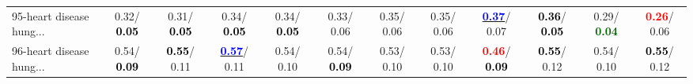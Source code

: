 \begin{table}[h]
\begin{center}
{\begin{tabular}{lc|c|c|c|c|c|c|c|c|c|c}
95-heart disease hung... &   0.32/\textcolor{black}{\textbf{  0.05}} &   0.31/\textcolor{black}{\textbf{  0.05}} &   0.34/\textcolor{black}{\textbf{  0.05}} &   0.34/\textcolor{black}{\textbf{  0.05}} &   0.33/  0.06 &   0.35/  0.06 &   0.35/  0.06 & \underline{\textcolor{blue}{\textbf{  0.37}}}/  0.07 & \textcolor{black}{\textbf{  0.36}}/\textcolor{black}{\textbf{  0.05}} &   0.29/\textcolor{darkgreen}{\textbf{  0.04}} & \textcolor{red}{\textbf{  0.26}}/  0.06 \\
96-heart disease hung... &   0.54/\textcolor{black}{\textbf{  0.09}} & \textcolor{black}{\textbf{  0.55}}/  0.11 & \underline{\textcolor{blue}{\textbf{  0.57}}}/  0.11 &   0.54/  0.10 &   0.54/\textcolor{black}{\textbf{  0.09}} &   0.53/  0.10 &   0.53/  0.10 & \textcolor{red}{\textbf{  0.46}}/\textcolor{black}{\textbf{  0.09}} & \textcolor{black}{\textbf{  0.55}}/  0.12 &   0.54/  0.10 & \textcolor{black}{\textbf{  0.55}}/  0.12 \\\end{tabular}}\label{stratsALCKappa2Allalla}
\end{center}
\end{table}
